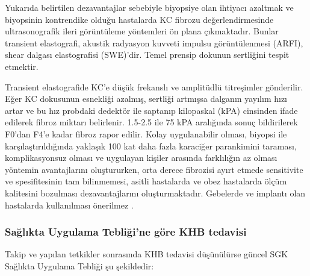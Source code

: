 Yukarıda belirtilen dezavantajlar sebebiyle biyopsiye olan ihtiyacı azaltmak ve biyopsinin kontrendike olduğu hastalarda KC fibrozu değerlendirmesinde ultrasonografik ileri görüntüleme yöntemleri ön plana çıkmaktadır. Bunlar transient elastografi, akustik radyasyon kuvveti impulsu görüntülenmesi (ARFI), shear dalgası elastografisi (SWE)'dir. Temel prensip dokunun sertliğini tespit etmektir.

Transient elastografide KC'e düşük frekanslı ve amplitüdlü titreşimler gönderilir. Eğer KC dokusunun esnekliği azalmış, sertliği artmışsa dalganın yayılım hızı artar ve bu hız probdaki dedektör ile saptanıp kilopaskal (kPA) cinsinden ifade edilerek fibroz miktarı belirlenir. 1.5-2.5 ile 75 kPA aralığında sonuç bildirilerek F0'dan F4'e kadar fibroz rapor edilir. Kolay uygulanabilir olması, biyopsi ile karşılaştırıldığında yaklaşık 100 kat daha fazla karaciğer parankimini taraması, komplikasyonsuz olması ve uygulayan kişiler arasında farklılığın az olması yöntemin avantajlarını oluştururken, orta derece fibrozisi ayırt etmede sensitivite ve spesifitesinin tam bilinmemesi, asitli hastalarda ve obez hastalarda ölçüm kalitesini bozulması dezavantajlarını oluşturmaktadır. Gebelerde ve implantı olan hastalarda kullanılması önerilmez \cite{alahdab17transient}.


\subsubsection{Sağlıkta Uygulama Tebliği'ne göre KHB tedavisi}
Takip ve yapılan tetkikler sonrasında KHB tedavisi düşünülürse güncel SGK Sağlıkta Uygulama Tebliği şu şekildedir:

